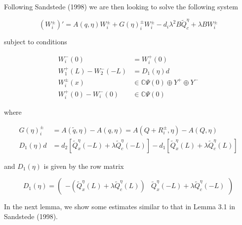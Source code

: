 \documentclass[12pt]{article}
\def\C{{\mathbb C}}
\begin{document}
Following Sandstede (1998) we are then looking to solve the following system

\begin{equation}\label{inteigQ}
(W_i^\pm)' = A(q, \eta)W_i^\pm + G(\eta)_i^\pm W_i^\pm - d_i \lambda^2 B \tilde{Q}^\eta_c + \lambda B W_i^\pm
\end{equation}  

subject to conditions

\begin{align*}
W_i^-(0) &= W_i^+(0) \\
W_1^+(L) - W_2^-(-L) &= D_1(\eta) d \\
W_i^\pm(x) &\in \C \Psi(0) \oplus Y^+ \oplus Y^- \\
W_i^+(0) - W_i^-(0) &\in \C \Psi(0) 
\end{align*}

where 

\begin{align*}
G(\eta)_i^\pm &= A(\tilde{q},\eta) - A(q,\eta) = A(Q + R_i^\pm, \eta) - A(Q, \eta) \\
D_1(\eta) d &= d_2 [ \tilde{Q}^\eta_x(-L) + \lambda \tilde{Q}^\eta_c(-L)] 
- d_1 [ \tilde{Q}^\eta_x(L) + \lambda \tilde{Q}^\eta_c(L)]
\end{align*}

and $D_1(\eta)$ is given by the row matrix 

\[
D_1(\eta) = \begin{pmatrix} -(\tilde{Q}^\eta_x(L) + \lambda \tilde{Q}^\eta_c(L)) & \tilde{Q}^\eta_x(-L) + \lambda \tilde{Q}^\eta_c(-L) \end{pmatrix}
\]

In the next lemma, we show some estimates similar to that in Lemma 3.1 in Sandstede (1998).
\end{document}
